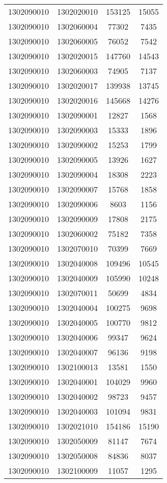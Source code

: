 \begin{longtable}{llcc}
1302090010 & 1302020010 & 153125 & 15055\\
1302090010 & 1302060004 & 77302 & 7435\\
1302090010 & 1302060005 & 76052 & 7542\\
1302090010 & 1302020015 & 147760 & 14543\\
1302090010 & 1302060003 & 74905 & 7137\\
1302090010 & 1302020017 & 139938 & 13745\\
1302090010 & 1302020016 & 145668 & 14276\\
1302090010 & 1302090001 & 12827 & 1568\\
1302090010 & 1302090003 & 15333 & 1896\\
1302090010 & 1302090002 & 15253 & 1799\\
1302090010 & 1302090005 & 13926 & 1627\\
1302090010 & 1302090004 & 18308 & 2223\\
1302090010 & 1302090007 & 15768 & 1858\\
1302090010 & 1302090006 & 8603 & 1156\\
1302090010 & 1302090009 & 17808 & 2175\\
1302090010 & 1302060002 & 75182 & 7358\\
1302090010 & 1302070010 & 70399 & 7669\\
1302090010 & 1302040008 & 109496 & 10545\\
1302090010 & 1302040009 & 105990 & 10248\\
1302090010 & 1302070011 & 50699 & 4834\\
1302090010 & 1302040004 & 100275 & 9698\\
1302090010 & 1302040005 & 100770 & 9812\\
1302090010 & 1302040006 & 99347 & 9624\\
1302090010 & 1302040007 & 96136 & 9198\\
1302090010 & 1302100013 & 13581 & 1550\\
1302090010 & 1302040001 & 104029 & 9960\\
1302090010 & 1302040002 & 98723 & 9457\\
1302090010 & 1302040003 & 101094 & 9831\\
1302090010 & 1302021010 & 154186 & 15190\\
1302090010 & 1302050009 & 81147 & 7674\\
1302090010 & 1302050008 & 84836 & 8037\\
1302090010 & 1302100009 & 11057 & 1295\\

\end{longtable}
